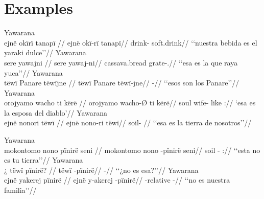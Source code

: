 \documentclass{memoir}
\begin{document}
\section{Examples}

\pex\label{id-aff-npred-nsubj}    \a Yawarana\\
    \label{convcosnoind-37}        \begingl
        \glpreamble ejnë okïrï tanapï //
        \gla ejnë okï-rï tanapï//
        \glb {} drink- soft.drink//
            \glft ‘‘nuestra bebida es el yaraki dulce’’//  
        \endgl 
    \a Yawarana\\
    \label{hist2mape-22}        \begingl
        \glpreamble sere yawajni //
        \gla sere yawaj-ni//
        \glb cassava.bread grate-.//
            \glft ‘‘esa es la que raya yuca’’//  
        \endgl 
    \a Yawarana\\
    \label{descmensgrme-68}        \begingl
        \glpreamble tëwï Panare tëwïjne //
        \gla tëwï Panare tëwï-jne//
        \glb {}  -//
            \glft ‘‘esos son los Panare’’//  
        \endgl 
    \a Yawarana\\
    \label{ctotawirdi-91}        \begingl
        \glpreamble orojyamo wacho ti kërë //
        \gla orojyamo wacho-Ø ti kërë//
        \glb soul wife- like ://
            \glft ‘esa es la esposa del diablo’//  
        \endgl 
    \a Yawarana\\
    \label{histyarirdi-54}        \begingl
        \glpreamble ejnë nonori tëwï //
        \gla ejnë nono-ri tëwï//
        \glb {} soil- //
            \glft ‘‘esa es la tierra de nosotros’’//  
        \endgl 
\xe

\pex\label{id-neg-npred-pinire-nsubj}    \a Yawarana\\
    \label{convamgu-42}        \begingl
        \glpreamble mokontomo nono pïnirë seni //
        \gla mokontomo nono -pïnirë seni//
        \glb {} soil - ://
            \glft ‘‘esta no es tu tierra’’//  
        \endgl 
    \a Yawarana\\
    \label{histpajirdi-84}        \begingl
        \glpreamble ¿ tëwï pïnirë? //
        \gla tëwï -pïnirë//
        \glb {} -//
            \glft ‘‘¿no es esa?’’//  
        \endgl 
    \a Yawarana\\
    \label{histyarirdi-312}        \begingl
        \glpreamble ejnë yakerej pïnirë //
        \gla ejnë y-akerej -pïnirë//
        \glb {} -relative -//
            \glft ‘‘no es nuestra familia’’//  
        \endgl 
\xe
\end{document}
